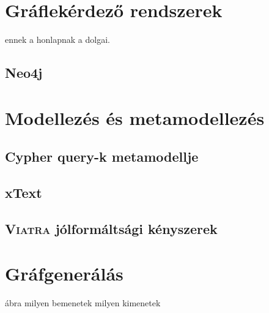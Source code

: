 \section{Gráflekérdező rendszerek}
\cite{neo4j}
ennek a honlapnak a dolgai.
\subsection{Neo4j}


\section{Modellezés és metamodellezés}
\subsection{Cypher query-k metamodellje}
\subsection{xText}
\subsection{\textsc{Viatra} jólformáltsági kényszerek}

\section{Gráfgenerálás}

ábra milyen bemenetek milyen kimenetek





